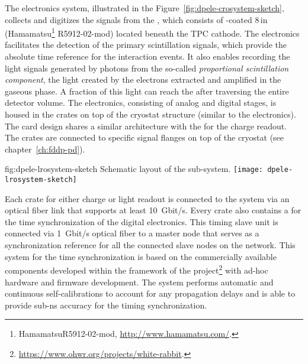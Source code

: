 The  electronics system, illustrated in the Figure~\ref{fig:dpele-crosystem-sketch},  collects and digitizes the signals from the , which consists of -coated \num{8}\,in  (Hamamatsu\footnote{Hamamatsu\texttrademark R5912-02-mod, \url{http://www.hamamatsu.com/}.} R5912-02-mod) located beneath the TPC cathode. The  electronics %
facilitates the detection of the primary scintillation signals, which provide the absolute time reference for the interaction events. It %
also enables recording the light signals generated by photons from the so-called \textit{proportional scintillation component}, the light created by the electrons extracted and amplified in the gaseous phase. A fraction of this light can reach the  after traversing the entire detector volume.  
The  electronics, consisting of analog and digital stages, is housed in the  crates on top of the cryostat structure (similar to the  electronics). The   card design shares a similar architecture with the  for the charge readout. The   crates are connected to specific  signal \fdth flanges on top of the cryostat (see chapter~\ref{ch:fddp-pd}).

\begin{dunefigure}{fig:dpele-lrosystem-sketch}
{Schematic layout of the   sub-system.}
\texttt{[image: dpele-lrosystem-sketch]}
\end{dunefigure}

Each  crate for either charge or light readout is connected to the  system via an optical fiber link that supports at least \SI{10}{Gbit/s}. 
Every crate also contains a %
 for the time synchronization of the digital electronics. This timing slave unit is connected via \SI{1}{Gbit/s} optical fiber to a master node that serves as a synchronization reference for all the connected slave nodes on the network. This system for the time synchronization is based on the commercially available components developed within the framework of the  project\footnote{\url{https://www.ohwr.org/projects/white-rabbit}.} with ad-hoc hardware and firmware development. The system performs automatic and continuous self-calibrations to account for any propagation delays and is able to provide sub-\si{\nano\s} accuracy for the timing synchronization.


